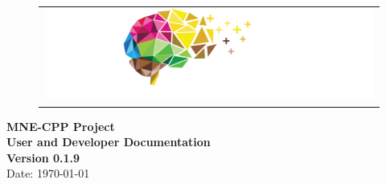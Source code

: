 \documentclass[12pt, twoside]{article}
\newcommand{\versionnumber}{0.1.9}
\begin{document}

\begin{titlepage}
\begin{figure}
\begin{tabular}{@{}l@{}}
\includegraphics[width=25cm]{mne-cpp_logo_notext.png}
\end{tabular}
\end{figure}


\begin{flushright}
\vspace{12pt}  
\vfill
\LARGE{\textbf{MNE-CPP Project}} \\

\Huge{\textbf{User and Developer Documentation}} \\
\Huge{\textbf{Version \versionnumber}} \\
\vspace{20pt}
\LARGE{Date: \today} \\
\vfill


\end{flushright}
\end{titlepage}
\let\cleardoublepage\clearpage


\end{document}
